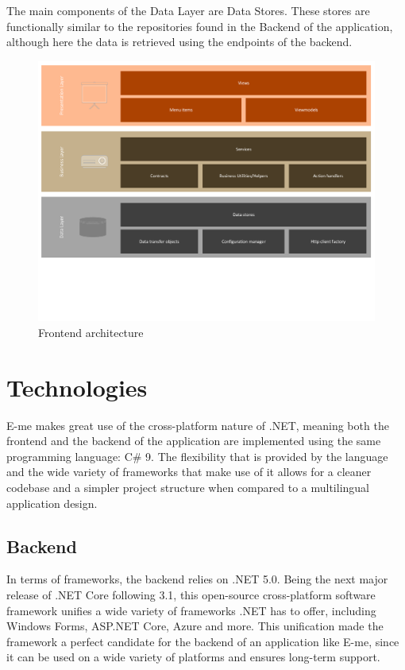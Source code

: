 The main components of the Data Layer are Data Stores.
These stores are functionally similar to the repositories found in the Backend of the application, although here the data is retrieved using the endpoints
of the backend.

\begin{figure}[H]
	\centering
	\includegraphics[scale=0.57]{frontend-architecture}
	\caption{Frontend architecture}
\end{figure}


\section{Technologies}

E-me makes great use of the cross-platform nature of .NET, meaning both the frontend and the backend of the application are implemented using the same
programming language: C\# 9.
The flexibility that is provided by the language and the wide variety of frameworks that make use of it allows for a cleaner codebase and a simpler
project structure when compared to a multilingual application design.

\subsection{Backend}

In terms of frameworks, the backend relies on .NET 5.0. Being the next major release of .NET Core following 3.1, this open-source cross-platform
software framework unifies a wide variety of frameworks .NET has to offer, including Windows Forms, ASP.NET Core, Azure and more.
This unification made the framework a perfect candidate for the backend of an application like E-me, since it can be used on a wide variety of
platforms and ensures long-term support.

